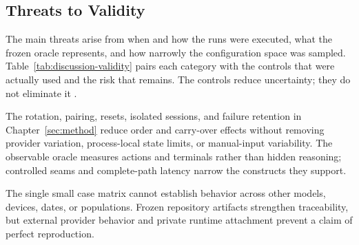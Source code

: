 \subsection{Threats to Validity}\label{subsec:discussion-validity}

The main threats arise from when and how the runs were executed, what the frozen
oracle represents, and how narrowly the configuration space was sampled.
Table~\ref{tab:discussion-validity} pairs each category with the controls that
were actually used and the risk that remains. The controls reduce uncertainty;
they do not eliminate it \cite{wohlin2012experimentation}.

The rotation, pairing, resets, isolated sessions, and failure retention in
Chapter~\ref{sec:method} reduce order and carry-over effects without removing
provider variation, process-local state limits, or manual-input variability.
The observable oracle measures actions and terminals rather than hidden
reasoning; controlled seams and complete-path latency narrow the constructs they
support.

The single small case matrix cannot establish behavior across other models,
devices, dates, or populations. Frozen repository artifacts strengthen
traceability, but external provider behavior and private runtime attachment
prevent a claim of perfect reproduction.

